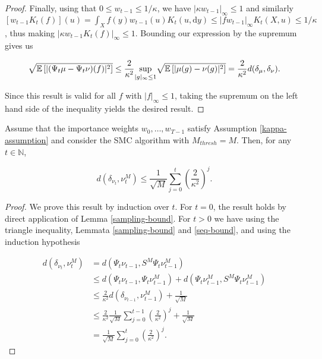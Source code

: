 \begin{proof}
  Finally, using that $0 \le w_{t-1} \le 1/\kappa$, we have $|\kappa w_{t-1}|_\infty \le 1$ and similarly $[w_{t-1}K_t(f)](u) = \int_X f(y)w_{t-1}(u)K_t(u, \text{d}y) \leq |fw_{t-1}|_\infty K_t(X, u) \leq 1 / \kappa$, thus making $|\kappa w_{t-1}K_t(f)|_\infty \leq 1$. Bounding our expression by the supremum gives us 

  \begin{equation*}
    \sqrt{\mathbb{E}\left[|(\Psi_t\mu - \Psi_t\nu)(f)|^2\right]} \le \frac2{\kappa^2}\underset{|g|_\infty \le 1}{\text{sup}} \sqrt{\mathbb{E}\left[|\mu(g) - \nu(g)|^2\right]} =  \frac2{\kappa^2}d(\delta_\mu, \delta_\nu).
  \end{equation*}

  Since this result is valid for all $f$ with $|f|_\infty \le 1$, taking the supremum on the left hand side of the inequality yields the desired result.
\end{proof}

\begin{theorem}\label{smc-convergence}
  Assume that the importance weights $w_0, \ldots, w_{T-1}$ satisfy Assumption \ref{kappa-assumption} and consider the SMC algorithm with $M_{thresh} = M$. Then, for any $t \in \mathbb{N}$,

  \begin{equation*}
    d(\delta_{\nu_t}, \nu_t^M) \leq \frac1{\sqrt{M}}\sum_{j=0}^t\left(\frac2{\kappa^2}\right)^j.
  \end{equation*}
\end{theorem}

\begin{proof}
  We prove this result by induction over $t$. For $t=0$, the result holds by direct application of Lemma \ref{sampling-bound}. For $t > 0$ we have using the triangle inequality, Lemmata \ref{sampling-bound} and \ref{seq-bound}, and using the induction hypothesis

  \begin{equation*}
    \begin{aligned}
      d(\delta_{\nu_t}, \nu_t^M)
      &= d(\Psi_t\nu_{t-1}, S^M\Psi_t\nu_{t-1}^M)\\
      &\le d(\Psi_t\nu_{t-1}, \Psi_t\nu_{t-1}^M) + d(\Psi_t\nu_{t-1}^M, S^M\Psi_t\nu_{t-1}^M)\\
      &\le \frac2{\kappa^2}d(\delta_{\nu_{t-1}}, \nu_{t-1}^M) + \frac1{\sqrt{M}}\\
      &\le \frac2{\kappa^2}\frac1{\sqrt{M}}\sum_{j=0}^{t-1}\left(\frac2{\kappa^2}\right)^j + \frac1{\sqrt{M}}\\
      &= \frac1{\sqrt{M}}\sum_{j=0}^t\left(\frac2{\kappa^2}\right)^j.
    \end{aligned}
  \end{equation*}
\end{proof}



